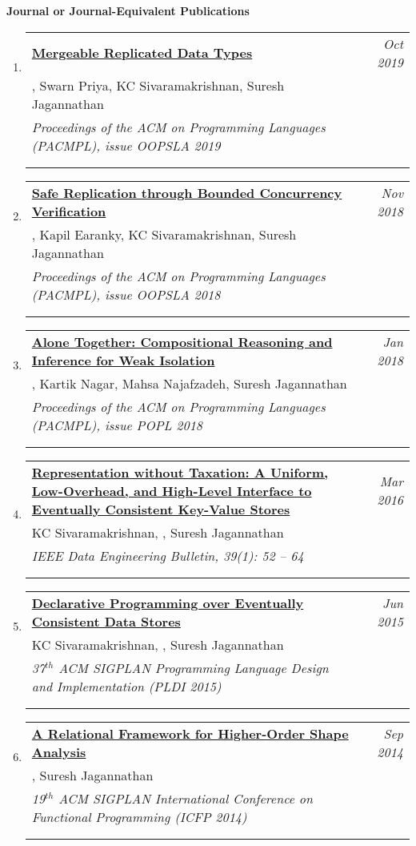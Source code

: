 \documentclass{article}
\makeatletter
\newenvironment{benumerate}[2]{
    \let\oldItem\item
    \def\item{\addtocounter{enumi}{-2}\oldItem}
    \begin{enumerate}[#2] \itemsep3pt
    \setcounter{enumi}{#1}
    \addtocounter{enumi}{1}}
  {\end{enumerate}}
\newenvironment{region}[3]{%
  {{\textbf{#1}}}
  \begin{benumerate}{#3}{\color{RoyalBlue}#2}}
  {\end{benumerate}\vspace{0.8ex}}
\newenvironment{publication}[6]
{ \item
  \begin{tabular*}{6.8in}{p{6in}@{\extracolsep{\fill}}r}
    \href{#1}{\textbf{#2}} & \textit{#3}\\ #4 &\\ \textit{#5}&\\
    \ifthenelse{\equal{#6}{}}{}{#6&\\}
  \end{tabular*}
} {}
\makeatother
\begin{document}
\begin{region} {Journal or Journal-Equivalent Publications}{{J}1}{7}
\begin{publication}{https://gowthamk.github.io/docs/mrdt.pdf}
		{Mergeable Replicated Data Types}
    {Oct 2019}{\ugkaki, Swarn Priya, KC Sivaramakrishnan, Suresh Jagannathan}
    {Proceedings of the ACM on Programming Languages (PACMPL), issue OOPSLA
    2019}
    {Article No.: 154; Pages 1 - 29; Acceptance rate: 36\%}
  \end{publication}

	\begin{publication}{https://gowthamk.github.io/docs/q9.pdf}
		{Safe Replication through Bounded Concurrency Verification}
    {Nov 2018}{\ugkaki, Kapil Earanky, KC Sivaramakrishnan, Suresh Jagannathan}
    {Proceedings of the ACM on Programming Languages (PACMPL), issue OOPSLA
    2018}
    {Article No.: 164; Pages 1 - 27; Acceptance rate: 28\%}
  \end{publication}

  \begin{publication}{https://gowthamk.github.io/docs/popl18.pdf}
    {Alone Together: Compositional Reasoning and Inference for Weak Isolation}
    {Jan 2018}
    {\ugkaki, Kartik Nagar, Mahsa Najafzadeh, Suresh Jagannathan}
    {Proceedings of the ACM on Programming Languages (PACMPL), issue POPL
    2018}
    {Article No.: 27; Pages 1 - 34; Acceptance rate: 24\%}
  \end{publication}

  \begin{publication}{https://gowthamk.github.io/docs/quelea_ieee16.pdf}
    {Representation without Taxation: A Uniform, Low-Overhead, and High-Level Interface to Eventually Consistent Key-Value Stores}
    {Mar 2016}{KC Sivaramakrishnan, \ugkaki, Suresh Jagannathan}
    {IEEE Data Engineering Bulletin, 39(1): 52 -- 64}
    {Invited article; Pages 52 - 64.}
  \end{publication}

  \begin{publication} {https://gowthamk.github.io/docs/quelea.pdf}
    {Declarative Programming over Eventually Consistent Data Stores}
    {Jun 2015} {KC Sivaramakrishnan, \ugkaki, Suresh Jagannathan}
    {37$^{th}$ ACM SIGPLAN Programming Language Design and
    Implementation (PLDI 2015)}
    {Accceptance rate: 19\%}
  \end{publication}

  \begin{publication}{https://gowthamk.github.io/docs/icfp2014.pdf}
    {A Relational Framework for Higher-Order Shape Analysis}
    {Sep 2014}{\ugkaki, Suresh Jagannathan}
    {19$^{th}$ ACM SIGPLAN  International Conference on Functional Programming (ICFP 2014)}
    {Pages 413 - 424 (double column); Accceptance rate: 29\%}
  \end{publication}

\end{region}
\end{document}
